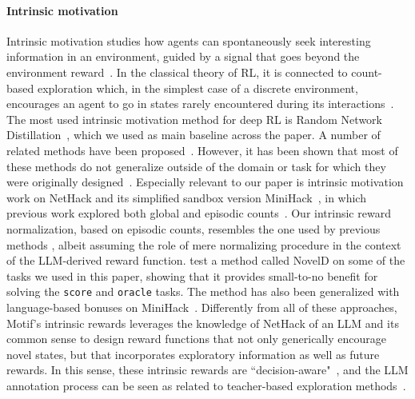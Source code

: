 \documentclass{article} %
\begin{document}
\paragraph{Intrinsic motivation}
 Intrinsic motivation studies how agents can spontaneously seek interesting information in an environment, guided by a signal that goes beyond the environment reward~\citep{Schmidhuber1991APF,oudeyer,wheredorewardscomefrom}.
In the classical theory of RL, it is connected to count-based exploration which, in the simplest case of a discrete environment, encourages an agent to go in states rarely encountered during its interactions~\citep{BellemareNeurips16}.
The most used intrinsic motivation method for deep RL is Random Network Distillation~\citep{burda2018exploration}, which we used as main baseline across the paper. 
A number of related methods have been proposed~\citep{Burda19}. However, it has been shown that most of these methods do not generalize outside of the domain or task for which they were originally designed~\citep{Taiga20}.
Especially relevant to our paper is intrinsic motivation work on NetHack and its simplified sandbox version MiniHack~\citep{Samvelyan2021}, in which previous work explored both global and episodic counts~\citep{HenaffJR23}.
Our intrinsic reward normalization, based on episodic counts, resembles the one used by previous methods \citep{Raileanu2020RIDE,HenaffRJR22}, albeit assuming the role of mere normalizing procedure in the context of the LLM-derived reward function.
\citet{ZhangNeurips21} test a method called NovelD on some of the tasks we used in this paper, showing that it provides small-to-no benefit for solving the \texttt{score} and \texttt{oracle} tasks.
The method has also been generalized with language-based bonuses on MiniHack~\citep{MuNeurips2022}.
Differently from all of these approaches, Motif's intrinsic rewards leverages the knowledge of NetHack of an LLM and its common sense to design reward functions that not only generically encourage novel states, but that incorporates exploratory information as well as future rewards. 
In this sense, these intrinsic rewards are ``decision-aware"~\citep{farahmand17a,Nachum0S17,DBLP:conf/nips/XuHS18,DOroModel2020,klissarov2022adaptive}, and the LLM annotation process can be seen as related to teacher-based exploration methods~\citep{Xu2018,doro2021metadynamic}.
\end{document}

